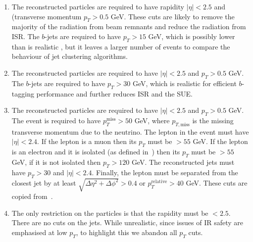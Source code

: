     \begin{enumerate}
        \item The reconstructed particles are required to have
            rapidity \(|\eta|< 2.5\) and (transverse momentum \(p_T > 0.5\) GeV.
            These cuts are likely to remove the majority of the radiation from beam remnants
            and reduce the radiation from ISR.
            The $b$-jets are required to have \(p_T > 15\) GeV, which is possibly lower than is realistic \cite{Chakraborty:2020vwj},
            but it leaves a larger number of events to compare the behaviour of jet clustering algorithms.

        \item  The reconstructed particles are required to have
             \(|\eta|< 2.5\) and \(p_T > 0.5\) GeV.
            The $b$-jets are required to have \(p_T > 30\) GeV, which is realistic for efficient $b$-tagging performance and further reduces ISR and the SUE.
            
        \item The reconstructed particles are required to have
             \(|\eta|< 2.5\) and \(p_T > 0.5\) GeV.
            The event is required to have  \(p_{T}^{\text{miss}} > 50\) GeV,
            where \(p_{T, \text{miss}}\) is the missing transverse momentum due to 
            the neutrino.
            The lepton in the event must have  \(|\eta|< 2.4\).
            If the lepton  is a muon then its \(p_T\) must be \(>  55\) GeV.
            If the lepton  is an electron and it is isolated (as defined in~\cite{Sirunyan:2018fpa}) then its \(p_T\) must be \(> 55\) GeV, if it is not isolated then \(p_T > 120\) GeV.
            The reconstructed jets must have \(p_T > 30\) and \(|\eta|< 2.4\).
            Finally, the lepton must be separated from the closest jet by at least
            \(\sqrt{\Delta\eta^2 + \Delta \phi^2} > 0.4\) or
            \(p_{T}^{\text{relative}} > 40\) GeV.
            These cuts are copied from~\cite{Sirunyan:2019rfa}.
        \item The only restriction on the particles is that the rapidity must be \(< 2.5\).
            There are no cuts on the jets. While unrealistic, since 
            issues of IR safety are emphasised at low \(p_T\),  to highlight this we abandon all \(p_T\) cuts.

    \end{enumerate}


